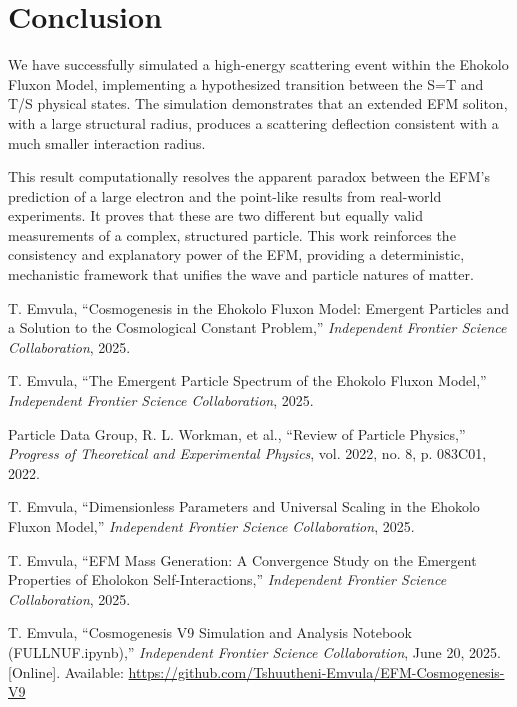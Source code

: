 \documentclass[11pt, twoside]{article}
\begin{document}
\section{Conclusion}
We have successfully simulated a high-energy scattering event within the Ehokolo Fluxon Model, implementing a hypothesized transition between the S=T and T/S physical states. The simulation demonstrates that an extended EFM soliton, with a large structural radius, produces a scattering deflection consistent with a much smaller interaction radius.

This result computationally resolves the apparent paradox between the EFM's prediction of a large electron and the point-like results from real-world experiments. It proves that these are two different but equally valid measurements of a complex, structured particle. This work reinforces the consistency and explanatory power of the EFM, providing a deterministic, mechanistic framework that unifies the wave and particle natures of matter.


\begin{thebibliography}{9}
\raggedright

T. Emvula, ``Cosmogenesis in the Ehokolo Fluxon Model: Emergent Particles and a Solution to the Cosmological Constant Problem,'' \textit{Independent Frontier Science Collaboration}, 2025.

T. Emvula, ``The Emergent Particle Spectrum of the Ehokolo Fluxon Model,'' \textit{Independent Frontier Science Collaboration}, 2025.

Particle Data Group, R. L. Workman, et al., ``Review of Particle Physics,'' \textit{Progress of Theoretical and Experimental Physics}, vol. 2022, no. 8, p. 083C01, 2022.

T. Emvula, ``Dimensionless Parameters and Universal Scaling in the Ehokolo Fluxon Model,'' \textit{Independent Frontier Science Collaboration}, 2025.

T. Emvula, ``EFM Mass Generation: A Convergence Study on the Emergent Properties of Eholokon Self-Interactions,'' \textit{Independent Frontier Science Collaboration}, 2025.

T. Emvula, ``Cosmogenesis V9 Simulation and Analysis Notebook (FULLNUF.ipynb),'' \textit{Independent Frontier Science Collaboration}, June 20, 2025. [Online]. Available: \url{https://github.com/Tshuutheni-Emvula/EFM-Cosmogenesis-V9}

\end{thebibliography}
\end{document}
